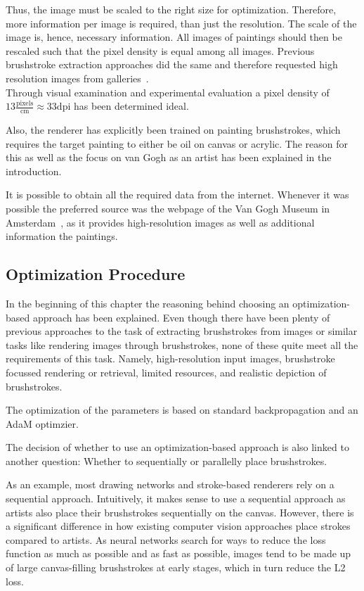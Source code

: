 Thus, the image must be scaled to the right size for optimization.
Therefore, more information per image is required, than just the resolution.
The scale of the image is, hence, necessary information.
All images of paintings should then be rescaled such that the pixel density is equal among all images.
Previous brushstroke extraction approaches did the same and therefore requested high resolution images from galleries~\cite{rhythmic, lamberti}.\\
Through visual examination and experimental evaluation a pixel density of $13 \frac{\text{pixels}}{\si{\centi\meter}} \approx 33 \text{dpi}$ has been determined ideal.

Also, the renderer has explicitly been trained on painting brushstrokes, which requires the target painting to either be oil on canvas or acrylic.
The reason for this as well as the focus on van Gogh as an artist has been explained in the introduction.

It is possible to obtain all the required data from the internet.
Whenever it was possible the preferred source was the webpage of the Van Gogh Museum in Amsterdam~\cite{VG_museum}, as it provides high-resolution images as well as additional information the paintings.

\subsection{Optimization Procedure}
In the beginning of this chapter the reasoning behind choosing an optimization-based approach has been explained.
Even though there have been plenty of previous approaches to the task of extracting brushstrokes from images or similar tasks like rendering images through brushstrokes, none of these quite meet all the requirements of this task.
Namely, high-resolution input images, brushstroke focussed rendering or retrieval, limited resources, and realistic depiction of brushstrokes.

The optimization of the parameters is based on standard backpropagation and an AdaM optimzier.


The decision of whether to use an optimization-based approach is also linked to another question: Whether to sequentially or parallelly place brushstrokes.

As an example, most drawing networks and stroke-based renderers rely on a sequential approach.
Intuitively, it makes sense to use a sequential approach as artists also place their brushstrokes sequentially on the canvas.
However, there is a significant difference in how existing computer vision approaches place strokes compared to artists.
As neural networks search for ways to reduce the loss function as much as possible and as fast as possible, images tend to be made up of large canvas-filling brushstrokes at early stages, which in turn reduce the L2 loss.

